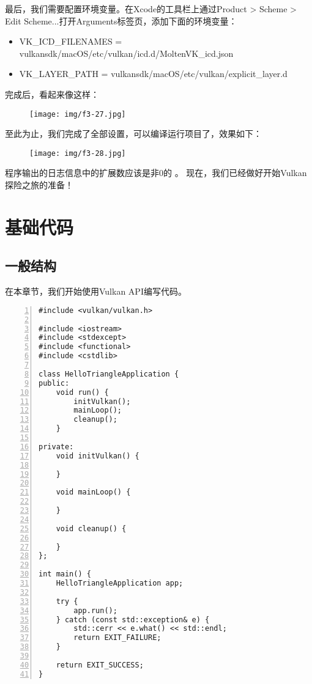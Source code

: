 \documentclass{ctexart}
\begin{document}
最后，我们需要配置环境变量。在Xcode的工具栏上通过Product > Scheme > Edit Scheme...打开Arguments标签页，添加下面的环境变量：

\begin{itemize}
	\item VK\_ICD\_FILENAMES = vulkansdk/macOS/etc/vulkan/icd.d/MoltenVK\_icd.json
	\item VK\_LAYER\_PATH = vulkansdk/macOS/etc/vulkan/explicit\_layer.d
\end{itemize}

完成后，看起来像这样：

\begin{figure}[H]
	\centering
	\texttt{[image: img/f3-27.jpg]}
\end{figure}

至此为止，我们完成了全部设置，可以编译运行项目了，效果如下：

\begin{figure}[H]
	\centering
	\texttt{[image: img/f3-28.jpg]}
\end{figure}

程序输出的日志信息中的扩展数应该是非0的
。
现在，我们已经做好开始Vulkan探险之旅的准备！

\newpage
\section{基础代码}

\subsection{一般结构}

在本章节，我们开始使用Vulkan API编写代码。

\begin{lstlisting}[language={[ANSI]C},keywordstyle=\color{blue!70},commentstyle=\color{red!50!green!50!blue!50},frame=shadowbox, rulesepcolor=\color{red!20!green!20!blue!20},basicstyle=\small,numbers=left, numberstyle=\tiny,breaklines=true]
#include <vulkan/vulkan.h>

#include <iostream>
#include <stdexcept>
#include <functional>
#include <cstdlib>

class HelloTriangleApplication {
public:
	void run() {
		initVulkan();
		mainLoop();
		cleanup();
	}

private:
	void initVulkan() {

	}

	void mainLoop() {

	}

	void cleanup() {

	}
};

int main() {
	HelloTriangleApplication app;

	try {
		app.run();
	} catch (const std::exception& e) {
		std::cerr << e.what() << std::endl;
		return EXIT_FAILURE;
	}

	return EXIT_SUCCESS;
}
\end{lstlisting}
\end{document}
